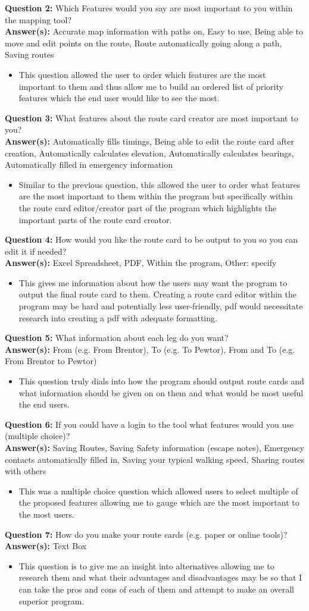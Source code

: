 \documentclass{article}
\newcommand{\QAnalysis}[4]{
    \noindent \textbf{Question #1: } #2 \\
    \noindent \textbf{Answer(s): } #3
    \begin{itemize}
        \item #4
    \end{itemize}
}
\begin{document}
            \QAnalysis{2}{Which Features would you say are most important to you within the mapping tool?}{Accurate map information with paths on, Easy to use, Being able to move and edit points on the route, Route automatically going along a path, Saving routes}{This question allowed the user to order which features are the most important to them and thus allow me to build an ordered list of priority features which the end user would like to see the most.}

            \QAnalysis{3}{What features about the route card creator are most important to you?}{Automatically fills timings, Being able to edit the route card after creation, Automatically calculates elevation, Automatically calculates bearings, Automatically filled in emergency information}{Similar to the previous question, this allowed the user to order what features are the most important to them within the program but specifically within the route card editor/creator part of the program which highlights the important parts of the route card creator.}

            \QAnalysis{4}{How would you like the route card to be output to you so you can edit it if needed?}{Excel Spreadsheet, PDF, Within the program, Other: specify}{This gives me information about how the users may want the program to output the final route card to them. Creating a route card editor within the program may be hard and potentially less user-friendly, pdf would necessitate research into creating a pdf with adequate formatting.}

            \QAnalysis{5}{What information about each leg do you want?}{From (e.g. From Brentor), To (e.g. To Pewtor), From and To (e.g. From Brentor to Pewtor)}{This question truly dials into how the program should output route cards and what information should be given on on them and what would be most useful the end users.}

            \QAnalysis{6}{If you could have a login to the tool what features would you use (multiple choice)?}{Saving Routes, Saving Safety information (escape notes), Emergency contacts automatically filled in, Saving your typical walking speed, Sharing routes with others}{This was a multiple choice question which allowed users to select multiple of the proposed features allowing me to gauge which are the most important to the most users.}

            \QAnalysis{7}{How do you make your route cards (e.g. paper or online tools)?}{Text Box}{This question is to give me an insight into alternatives allowing me to research them and what their advantages and disadvantages may be so that I can take the pros and cons of each of them and attempt to make an overall superior program.}
\end{document}
